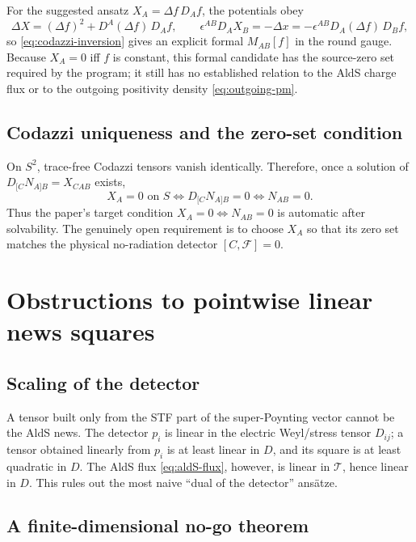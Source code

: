 \documentclass[11pt,a4paper]{article}
\newcommand{\cT}{\mathcal{T}}
\newcommand{\cF}{\mathcal{F}}
\begin{document}
For the suggested ansatz \(X_A=\Delta f\,D_Af\), the potentials obey
\begin{equation}
  \Delta X=(\Delta f)^2+D^A(\Delta f)\,D_Af,
  \qquad
  \epsilon^{AB}D_AX_B=-\Delta x
  =-\epsilon^{AB}D_A(\Delta f)\,D_Bf ,
\end{equation}
so \eqref{eq:codazzi-inversion} gives an explicit formal \(M_{AB}[f]\) in the round gauge.  Because \(X_A=0\) iff \(f\) is constant, this formal candidate has the source-zero set required by the program; it still has no established relation to the AldS charge flux or to the outgoing positivity density \eqref{eq:outgoing-pm}.

\subsection{Codazzi uniqueness and the zero-set condition}

On \(S^2\), trace-free Codazzi tensors vanish identically.  Therefore, once a solution of \(D_{[C}N_{A]B}=X_{CAB}\) exists,
\begin{equation}
  X_A=0 \text{ on } S
  \iff
  D_{[C}N_{A]B}=0
  \iff
  N_{AB}=0 .
\end{equation}
Thus the paper's target condition \(X_A=0\iff N_{AB}=0\) is automatic after solvability.  The genuinely open requirement is to choose \(X_A\) so that its zero set matches the physical no-radiation detector \([C,\cF]=0\).

\section{Obstructions to pointwise linear news squares}

\subsection{Scaling of the detector}

A tensor built only from the STF part of the super-Poynting vector cannot be the AldS news.  The detector \(p_i\) is linear in the electric Weyl/stress tensor \(D_{ij}\); a tensor obtained linearly from \(p_i\) is at least linear in \(D\), and its square is at least quadratic in \(D\).  The AldS flux \eqref{eq:aldS-flux}, however, is linear in \(\cT\), hence linear in \(D\).  This rules out the most naive “dual of the detector” ans{\"a}tze.

\subsection{A finite-dimensional no-go theorem}
\end{document}
